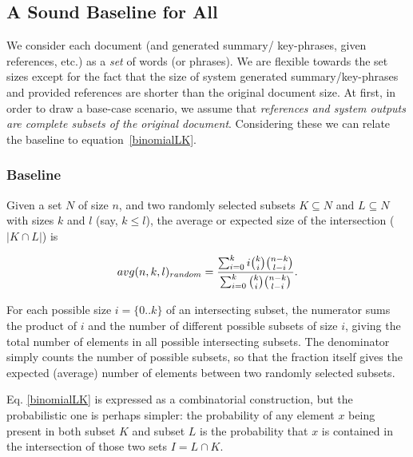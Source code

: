 \documentclass{sig-alternate-05-2015}
\begin{document}
\subsection{A Sound Baseline for All}
We consider each document (and generated summary/ key-phrases, given references, etc.) as a \emph{set} of words (or phrases). We are flexible towards the set sizes except for the fact that the size of system generated summary/key-phrases and provided references are shorter than the original document size. At first, in order to draw a base-case scenario, we assume that \emph{references and system outputs are complete subsets of the original document}. Considering these we can relate the baseline to equation~\ref{binomialLK}.
\subsubsection*{Baseline}   
\label{avgI}
Given a set $N$ of size $n$, and two randomly selected subsets $K\subseteq N$ and $L \subseteq N$ with sizes $k$ and $l$ (say, $k \le l$), the average or expected size of the intersection ($|K \cap L|$) is 
\begin{small}
\begin{equation}
avg(n,k,l)_{random} = {{\sum_{i=0}^k i \binom{k}{i}\binom{n-k}{l-i}} \over
{\sum_{i=0}^k \binom{k}{i}\binom{n-k}{l-i}}}.
\label{binomialLK}
\end{equation}
\end{small}
For each possible size $i = \{0..k\}$ of an intersecting subset, the numerator sums the product of $i$ and the number of different possible subsets of size $i$, giving the total number of elements in all possible intersecting subsets. %
The denominator simply counts the number of possible subsets, so that the fraction itself gives the expected (average) number of elements between two randomly selected subsets.
\par Eq. \ref{binomialLK} is expressed as a combinatorial construction, but the probabilistic one is perhaps simpler: the probability of any element $x$ being present in both subset $K$ and subset $L$ is the probability that $x$ is contained in the intersection of those two sets $I = L \cap K$.
\end{document}
